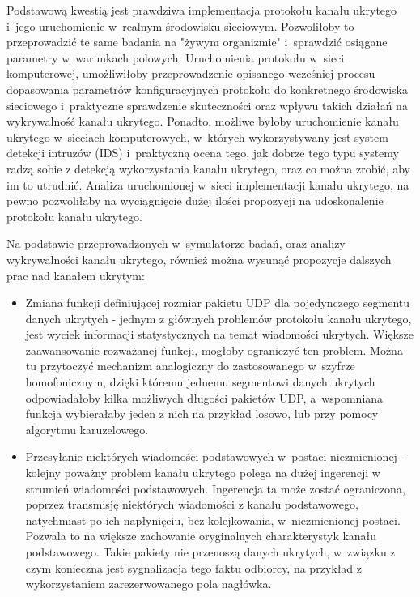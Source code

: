 \documentclass[a4paper, twoside, 12pt]{report}
\begin{document}
    Podstawową kwestią jest prawdziwa implementacja protokołu kanału ukrytego
    i~jego uruchomienie w~realnym środowisku sieciowym. Pozwoliłoby to przeprowadzić
    te same badania na "żywym organizmie" i~sprawdzić osiągane parametry w~warunkach polowych.
    Uruchomienia protokołu w~sieci komputerowej, umożliwiłoby przeprowadzenie opisanego
    wcześniej procesu dopasowania parametrów konfiguracyjnych protokołu do konkretnego
    środowiska sieciowego i~praktyczne sprawdzenie skuteczności oraz wpływu takich
    działań na wykrywalność kanału ukrytego. Ponadto, możliwe byłoby uruchomienie
    kanału ukrytego w~sieciach komputerowych, w~których wykorzystywany jest system
    detekcji intruzów (IDS) i~praktyczną ocena tego, jak dobrze tego typu systemy
    radzą sobie z detekcją wykorzystania kanału ukrytego, oraz co można zrobić,
    aby im to utrudnić. Analiza uruchomionej w~sieci implementacji kanału ukrytego,
    na pewno pozwoliłaby na wyciągnięcie dużej ilości propozycji na udoskonalenie
    protokołu kanału ukrytego.

    Na podstawie przeprowadzonych w~symulatorze badań, oraz analizy wykrywalności
    kanału ukrytego, również można wysunąć propozycje dalszych prac nad kanałem ukrytym:

    \begin{itemize}
        \item Zmiana funkcji definiującej rozmiar pakietu UDP dla pojedynczego segmentu danych ukrytych -
            jednym z głównych problemów protokołu kanału ukrytego, jest wyciek
            informacji statystycznych na temat wiadomości ukrytych.
            Większe zaawansowanie rozważanej funkcji, mogłoby ograniczyć ten problem.
            Można tu przytoczyć mechanizm analogiczny do zastosowanego w~szyfrze
            homofonicznym, dzięki któremu jednemu segmentowi danych ukrytych
            odpowiadałoby kilka możliwych długości pakietów UDP, a~wspomniana funkcja
            wybierałaby jeden z nich na przykład losowo, lub przy pomocy algorytmu
            karuzelowego.
        \item Przesyłanie niektórych wiadomości podstawowych w~postaci niezmienionej -
            kolejny poważny problem kanału ukrytego polega na dużej ingerencji w
            strumień wiadomości podstawowych. Ingerencja ta może zostać ograniczona, poprzez
            transmisję niektórych wiadomości z kanału podstawowego, natychmiast
            po ich napłynięciu, bez kolejkowania, w~niezmienionej postaci.
            Pozwala to na większe zachowanie oryginalnych charakterystyk kanału
            podstawowego. Takie pakiety nie przenoszą danych ukrytych, w~związku
            z czym konieczna jest sygnalizacja tego faktu odbiorcy, na przykład
            z wykorzystaniem zarezerwowanego pola nagłówka.
    \end{itemize}

\clearpage
{}


\end{document}
